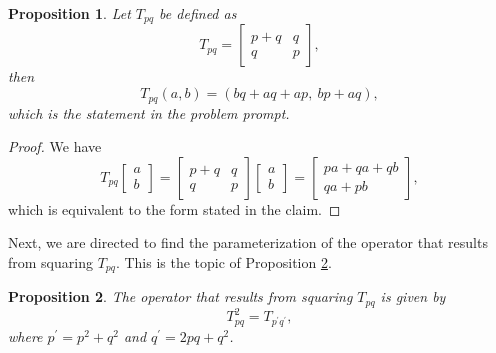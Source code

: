 \documentclass{article}
\newtheorem{proposition}{Proposition}
\begin{document}
\begin{proposition}
  \label{thm:t-pq}
  Let $T_{pq}$ be defined as
  \begin{equation*}
    T_{pq} =
    \begin{bmatrix}
      p + q & q \\
      q     & p
    \end{bmatrix},
  \end{equation*}
  then
  \begin{equation*}
    T_{pq}(a, b) = (bq + aq + ap,~ bp + aq),
  \end{equation*}
  which is the statement in the problem prompt.
\end{proposition}
\vspace{5mm}

\begin{proof}
  We have
  \begin{equation*}
    T_{pq}
    \begin{bmatrix}
      a \\
      b
    \end{bmatrix}
    =
    \begin{bmatrix}
      p + q & q \\
      q     & p
    \end{bmatrix}
    \begin{bmatrix}
      a \\
      b
    \end{bmatrix}
    =
    \begin{bmatrix}
      pa + qa + qb \\
      qa + pb
    \end{bmatrix},
  \end{equation*}
  which is equivalent to the form stated in the claim.
\end{proof}
\vspace{5mm}


Next, we are directed to find the parameterization of the operator that results
from squaring $T_{pq}$.  This is the topic of Proposition \ref{thm:t-square}.
\begin{proposition}
  \label{thm:t-square}
  The operator that results from squaring $T_{pq}$ is given by
  \begin{equation*}
    T_{pq}^2 = T_{p^{\prime} q^{\prime}},
  \end{equation*}
  where $p^{\prime} = p^2 + q^2$ and $q^{\prime} = 2pq + q^2$.
\end{proposition}
\vspace{5mm}
\end{document}
